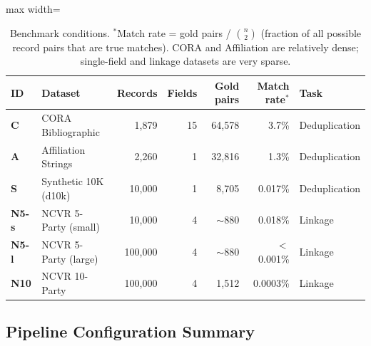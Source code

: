 \documentclass[11pt, a4paper]{article}
\begin{document}
\begin{table}[h!]
\centering
\small
\begin{adjustbox}{max width=\linewidth}
\begin{tabular}{llrrrrl}
\toprule
\textbf{ID} & \textbf{Dataset} & \textbf{Records} & \textbf{Fields} &
\textbf{Gold pairs} & \textbf{Match rate$^*$} & \textbf{Task} \\
\midrule
\textbf{C}    & CORA Bibliographic       & 1,879   & 15 & 64,578  & 3.7\%   & Deduplication \\
\textbf{A}    & Affiliation Strings      & 2,260   &  1 & 32,816  & 1.3\%   & Deduplication \\
\textbf{S}    & Synthetic 10K (d10k)     & 10,000  &  1 & 8,705   & 0.017\% & Deduplication \\
\textbf{N5-s} & NCVR 5-Party (small)     & 10,000  &  4 & $\sim$880 & 0.018\% & Linkage \\
\textbf{N5-l} & NCVR 5-Party (large)     & 100,000 &  4 & $\sim$880 & $<$0.001\% & Linkage \\
\textbf{N10}  & NCVR 10-Party            & 100,000 &  4 & 1,512   & 0.0003\% & Linkage \\
\bottomrule
\end{tabular}
\end{adjustbox}
\caption{Benchmark conditions. $^*$Match rate = gold pairs / $\binom{n}{2}$ (fraction of all possible
record pairs that are true matches). CORA and Affiliation are relatively dense;
single-field and linkage datasets are very sparse.}
\end{table}

\subsection{Pipeline Configuration Summary}
\end{document}
